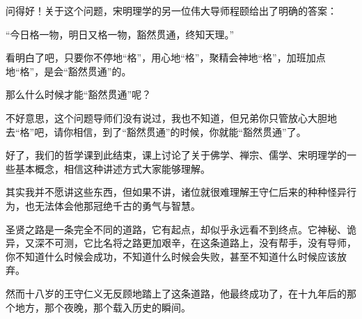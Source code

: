 \begin{multicols}{\theparacolNo}
问得好！关于这个问题，宋明理学的另一位伟大导师程颐给出了明确的答案：

“今日格一物，明日又格一物，豁然贯通，终知天理。”

看明白了吧，只要你不停地“格”，用心地“格”，聚精会神地“格”，加班加点地“格”，是会“豁然贯通”的。

那么什么时候才能“豁然贯通”呢？

不好意思，这个问题导师们没有说过，我也不知道，但兄弟你只管放心大胆地去“格”吧，请你相信，到了“豁然贯通”的时候，你就能“豁然贯通”了。

好了，我们的哲学课到此结束，课上讨论了关于佛学、禅宗、儒学、宋明理学的一些基本概念，相信这种讲述方式大家能够理解。

其实我并不愿讲这些东西，但如果不讲，诸位就很难理解王守仁后来的种种怪异行为，也无法体会他那冠绝千古的勇气与智慧。

圣贤之路是一条完全不同的道路，它有起点，却似乎永远看不到终点。它神秘、诡异，又深不可测，它比名将之路更加艰辛，在这条道路上，没有帮手，没有导师，你不知道什么时候会成功，不知道什么时候会失败，甚至不知道什么时候应该放弃。

然而十八岁的王守仁义无反顾地踏上了这条道路，他最终成功了，在十九年后的那个地方，那个夜晚，那个载入历史的瞬间。
\ifnum{}
	\end{multicols}
\fi
\newpage
